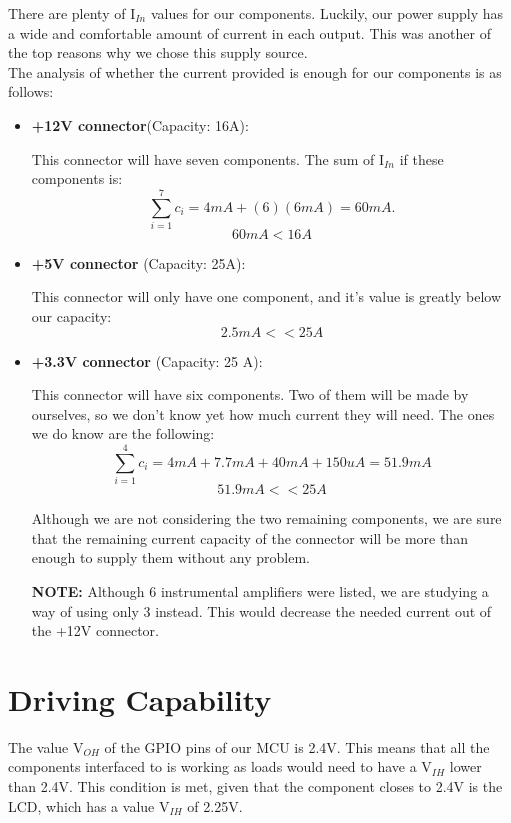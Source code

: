 \documentclass[11pt]{article}
\begin{document}
There are plenty of I$_{In}$ values for our components. Luckily, our power supply has a wide and comfortable amount of current in each output. This was another of the top reasons why we chose this supply source. \\

The analysis of whether the current provided is enough for our components is as follows:

\begin{itemize}
  \item \textbf{+12V connector}(Capacity: 16A):
  
  This connector will have seven components. The sum of I$_{In}$ if these components is: $$ \sum_{i=1}^{7} c_i = 4mA + (6)(6mA) = 60mA. $$ $$60 mA < 16A $$ 
  \item \textbf{+5V connector} (Capacity: 25A):
  
  This connector will only have one component, and it's value is greatly below our capacity: $$2.5 mA << 25A $$ 
  
  \item \textbf{+3.3V connector} (Capacity: 25 A):
  
  This connector will have six components. Two of them will be made by ourselves, so we don't know yet how much current they will need. The ones we do know are the following: $$\sum_{i=1}^{4} c_i = 4mA + 7.7 mA + 40 mA + 150 uA = 51.9 mA $$  $$51.9mA << 25A$$
  
  Although we are not considering the two remaining components, we are sure that the remaining current capacity of the connector will be more than enough to supply them without any problem.
  
  \textbf{NOTE:} Although 6 instrumental amplifiers were listed, we are studying a way of using only 3 instead. This would decrease the needed current out of the +12V connector.
  
  
\end{itemize} 


\section{Driving Capability}
The value V$_{OH}$ of the GPIO pins of our MCU is 2.4V. This means that all the components interfaced to is working as loads would need to have a V$_{IH}$ lower than 2.4V. This condition is met, given that the component closes to 2.4V is the LCD, which has a value V$_{IH}$ of 2.25V. \\
\end{document}
